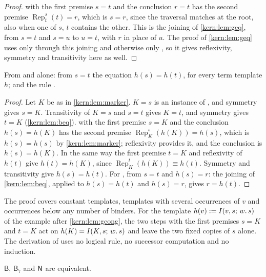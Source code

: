 \begin{proof}
 with the first premise $s=t$ and the conclusion $r=t$ has the
second premise $\operatorname{Rep}_{t}^{s}(t)=r$, which is $s=r$, since the
traversal matches at the root, also when one of $s$, $t$ contains the other.
This is the joining of \cref{kern:lem:geq}, from $s=t$ and $s=u$ to $u=t$,
with $r$ in place of $u$.  The proof of \cref{kern:lem:geq} uses
 only through this joining and otherwise only ,
so it gives reflexivity, symmetry and transitivity here as well.
\end{proof}

\begin{lemma}
\label{kern:lem:bcong}
From  and  alone: from $s=t$ the equation
$h(s)=h(t)$, for every term template $h$; and the rule .
\end{lemma}

\begin{proof}
Let $K$ be as in \cref{kern:lem:marker}.  $K=s$ is an instance of
, and symmetry gives $s=K$.  Transitivity of $K=s$ and $s=t$
gives $K=t$, and symmetry gives $t=K$ (\cref{kern:lem:beq}).
 with the first premise $s=K$ and the conclusion $h(s)=h(K)$
has the second premise $\operatorname{Rep}_{K}^{s}(h(K))=h(s)$, which is
$h(s)=h(s)$ by \cref{kern:lem:marker}; reflexivity provides it, and the
conclusion is $h(s)=h(K)$.  In the same way the first premise $t=K$ and
reflexivity of $h(t)$ give $h(t)=h(K)$, since
$\operatorname{Rep}_{K}^{t}(h(K))\equiv h(t)$.  Symmetry and transitivity
give $h(s)=h(t)$.  For , from $s=t$ and $h(s)=r$: the joining of
\cref{kern:lem:beq}, applied to $h(s)=h(t)$ and $h(s)=r$, gives $r=h(t)$.
\end{proof}

The proof covers constant templates, templates with several occurrences of
$v$ and occurrences below any number of binders.  For the template
$h(v)\mathrel{:=}I(v,s;\,w.\,s)$ of the example after \cref{kern:lem:gcong}, the
two steps with the first premises $s=K$ and $t=K$ act on
$h(K)=I(K,s;\,w.\,s)$ and leave the two fixed copies of $s$ alone.  The
derivation of  uses no logical rule, no successor computation
and no induction.

\begin{theorem}
\label{kern:thm:brep}
$\mathsf{B}$, $\mathsf{B}_{7}$ and $\mathsf{N}$ are equivalent.
\end{theorem}

